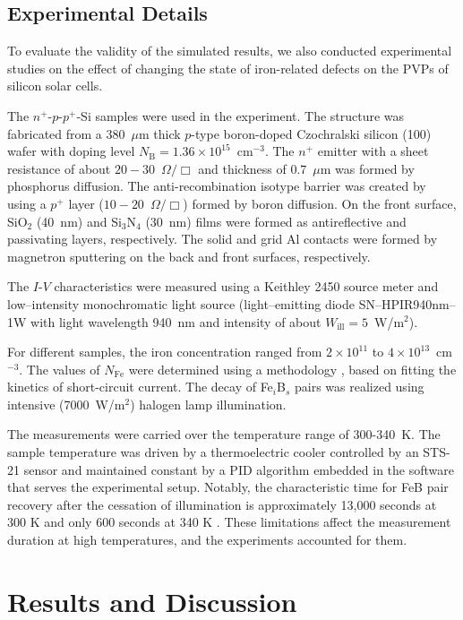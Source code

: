 \documentclass[a4paper,fleqn]{cas-sc}
\begin{document}
\subsection{Experimental Details}

To evaluate the validity of the simulated results,
we also conducted experimental studies on the effect of changing the state of iron-related defects on the PVPs of silicon solar cells.

The $n^+$-$p$-$p^+$-Si samples were used in the experiment.
The structure was fabricated from a 380~$\mu$m thick $p$-type boron-doped
Czochralski silicon (100) wafer with doping level $N_\mathrm{B}=1.36\times10^{15}$~cm$^{-3}$.
The $n^+$ emitter with a sheet resistance of about $20-30$~$\Omega/\Box$
and  thickness of $0.7$~$\mu$m was formed by phosphorus diffusion.
The anti-recombination isotype barrier was created by using a $p^+$
layer ($10-20$~$\Omega/\Box$) formed by boron diffusion.
On the front surface, SiO$_2$ (40~nm) and Si$_3$N$_4$ (30~nm) films were formed as antireflective and passivating layers, respectively.
The solid and grid Al contacts were formed by magnetron sputtering on the back and front surfaces, respectively.

The $I$-$V$ characteristics were measured using a Keithley 2450 source meter and
low--intensity monochromatic light source (light--emitting diode SN--HPIR940nm--1W with light wavelength 940~nm and intensity of about  $W_\mathrm{ill} = 5$~W/m$^{2}$).

For different samples, the iron concentration ranged from $2\times10^{11}$ to $4\times10^{13}$~cm$^{-3}$.
The values of $N_\mathrm{Fe}$ were determined using a methodology \cite{Olikh2022:JMatSci,Olikh2021JAP}, based on fitting the kinetics of short-circuit current.
The decay of Fe$_i$B$_s$ pairs was realized using intensive (7000~W/$\mathrm{m}^{2}$) halogen lamp illumination.

The measurements were carried over the temperature range of 300-340~K.
The sample temperature was driven by a thermoelectric cooler controlled by an STS-21 sensor
and maintained constant by a PID algorithm embedded in the software that serves the experimental setup.
Notably, the characteristic time for FeB pair recovery after the cessation of illumination is approximately 13,000 seconds at 300 K and only 600 seconds at 340 K \cite{FeBAssJAP2014,FeBKin2019}.
These limitations affect the measurement duration at high temperatures, and the experiments accounted for them.

\section{Results and Discussion}%
\end{document}
